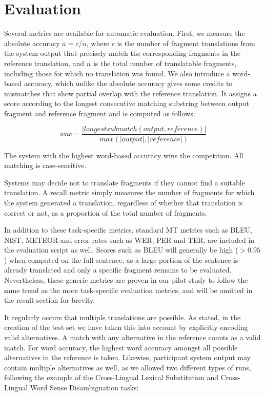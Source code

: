 \section{Evaluation}
\label{sec:semeval2014task5evaluation}

Several metrics are available for automatic evaluation. First, we measure the
absolute accuracy $a = c/n$, where $c$ is the number of fragment translations
from the system output that precisely match the corresponding fragments in the
reference translation, and $n$ is the total number of translatable fragments,
including those for which no translation was found. We also introduce a
word-based accuracy, which unlike the absolute accuracy gives some credits to
mismatches that show partial overlap with the reference translation.  It
assigns a score according to the longest consecutive matching substring between
output fragment and reference fragment and is computed as follows:

\begin{equation}
wac = \frac{|longestsubmatch(output,reference)|}{max(|output|,|reference|)}
\end{equation}

The system with the highest word-based accuracy wins the competition. All
matching is case-sensitive.

Systems may decide not to translate fragments if they cannot find a suitable
translation. A recall metric simply measures the number of fragments for which
the system generated a translation, regardless of whether that translation is
correct or not, as a proportion of the total number of fragments.

In addition to these task-specific metrics, standard MT metrics such as BLEU,
NIST, METEOR and error rates such as WER, PER and TER, are included in the
evaluation script as well. Scores such as BLEU will generally be high ($>
0.95$) when computed on the full sentence, as a large portion of the sentence
is already translated and only a specific fragment remains to be evaluated.
Nevertheless, these generic metrics are proven in our pilot study to follow the
same trend as the more task-specific evaluation metrics, and will be omitted in
the result section for brevity.

It regularly occurs that multiple translations are possible. As stated, in the
creation of the test set we have taken this into account by explicitly encoding
valid alternatives. A match with any alternative in the reference counts as a
valid match. For word accuracy, the highest word accuracy amongst all possible
alternatives in the reference is taken. Likewise, participant system output may
contain multiple alternatives as well, as we allowed two different types of
runs, following the example of the Cross-Lingual Lexical Substitution and
Cross-Lingual Word Sense Disambiguation tasks:

